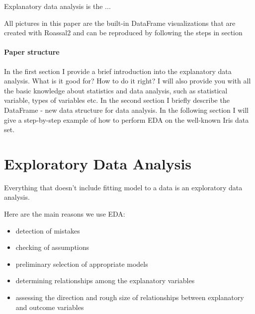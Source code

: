 \documentclass{article}
\begin{document}
Explanatory data analysis is the ...

All pictures in this paper are the built-in DataFrame visualizations that are created with Roassal2 and can be reproduced by following the steps in section \

\paragraph{Paper structure} In the first section I provide a brief introduction into the explanatory data analysis. What is it good for? How to do it right? I will also provide you with all the basic knowledge about statistics and data analysis, such as statistical variable, types of variables etc. In the second section I briefly describe the DataFrame - new data structure for data analysis. In the following section I will give a step-by-step example of how to perform EDA on the well-known Iris data set.





%
%
%
%

\section{Exploratory Data Analysis}
\label{sec:eda}

Everything that doesn't include fitting model to a data is an exploratory data analysis.

Here are the main reasons we use EDA:
\begin{itemize}
  \item detection of mistakes
  \item checking of assumptions
  \item preliminary selection of appropriate models
  \item determining relationships among the explanatory variables
  \item assessing the direction and rough size of relationships between explanatory and outcome variables
\end{itemize}
\end{document}
